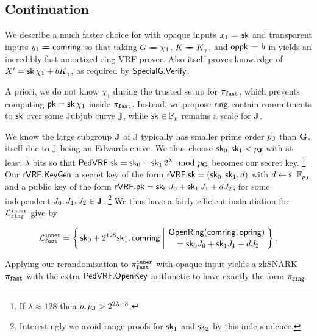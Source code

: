 \subsection{Continuation}
\label{subsec:rvrf_faster}


\def\longeq{=\mathrel{\mkern-10mu}=}%
We describe a much faster choice \pifast for \piring with
opaque inputs $x_1 \longeq \sk$ and transparent inputs $y_1 \longeq \comring$
 so that taking
 $\genG \longeq \chi_1$, $\genB \longeq \genB_\gamma$, and $\openpk \longeq b$
in \PedVRF yields an incredibly fast amortized ring VRF prover.
Also \PedVRF itself proves knowledge of $X' =  \mathsf{sk}\, \chi_1 + b K_\gamma $,
 as required by ${\mathsf{SpecialG}}.{\mathsf{Verify}}$.

A priori, we do not know $\chi_1$ during the trusted setup for $\pi_{\mathtt{fast}}$,
which prevents computing $\mathsf{pk} = \mathsf{sk}\, \chi_1$ inside $\pi_{\mathtt{fast}}$.
Instead, we propose $\mathsf{ring}$ contain commitments to $\mathsf{sk}$ over
some Jubjub curve ${\mathbb{J}}$, while $\mathsf{sk} \in \mathbb{F}_p$ remains a scale for ${\mathbf{J}}$.

We know the large subgroup ${\mathbf{J}}$ of ${\mathbb{J}}$ typically has smaller prime
order $p_{\mathbf{J}}$ than ${\mathbf{G}}$, itself due to ${\mathbb{J}}$ being an Edwards curve.
%
We thus choose $\mathsf{sk}_0,\mathsf{sk}_1 < p_{\mathbf{J}}$ with at least $\lambda$ bits
so that
 ${\mathsf{PedVRF}}.\mathsf{sk} = \mathsf{sk}_0 + \mathsf{sk}_1 \, 2^{\lambda} \mod p_{\mathbf{G}}$
becomes our secret key.
\footnote{If $\lambda \approx 128$ then $p, p_{\mathbf{J}} > 2^{2\lambda-3}$.}
Our ${\mathsf{rVRF}}.{\mathsf{KeyGen}}$ 
a secret key of the form ${\mathsf{rVRF}}.\mathsf{sk} = (\mathsf{sk}_0,\mathsf{sk}_1,d)$
 with $d \leftsample \F_{p_\grJ}$ and
a public key of the form
 ${\mathsf{rVRF}}.\mathsf{pk} = \mathsf{sk}_0\, J_0 + \mathsf{sk}_1\, J_1 + d J_2$,
for some independent $J_0,J_1,J_2 \in {\mathbf{J}}$. %
\footnote{Interestingly we avoid range proofs for $\mathsf{sk}_1$ and $\mathsf{sk}_2$ by this independence.}
We thus have a fairly efficient instantiation for $\mathcal{L}_{\mathtt{ring}}^{\mathtt{inner}}$ give by

$$ \Lfast^\inner = \Setst{ \sk_0 + 2^{128} \sk_1, \comring }{
 \eprint{ \exists d,\openring \textrm{\ s.t.\ } }{}
 \genfrac{}{}{0pt}{}{ \eprint{\rVRF.}{}\OpenRing(\comring,\openring) }{ \,\, = \sk_0 \genJ_0 + \sk_1 \genJ_1 + d \genJ_2 }
} \mathperiod $$

Applying our rerandomization \Reprove to $\pi_{\mathtt{fast}}^{\mathtt{inner}}$ with opaque input
yields a zkSNARK $\pi_{\mathtt{fast}}$ with the extra ${\mathsf{PedVRF}}.{\mathsf{OpenKey}}$ arithmetic to
have exactly the form $\pi_{\mathtt{ring}}$.

